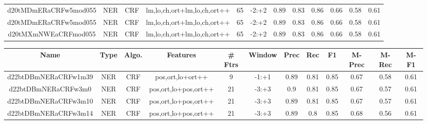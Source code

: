\documentclass[a4paper]{article}
\begin{document}
\begin{landscape}
\begin{center}
\begin{tabular}{ |c|c|c|c|c|c|c|c|c|c|c|c|}
 
 	
 	\small{ d20tMDmERaCRFw5mod055 } & \small{ NER} & \small{  CRF }  & lm,lo,ch,ort+lm,lo,ch,ort++  &  65 &  \small{  -2:+2 }  &  0.89 & 0.83 & 0.86  &  0.66 & 0.58 & 0.61 \\
 	

 
 	
 	\small{ d20tMDmERaCRFw5mod055 } & \small{ NER} & \small{  CRF }  & lm,lo,ch,ort+lm,lo,ch,ort++  &  65 &  \small{  -2:+2 }  &  0.89 & 0.83 & 0.86  &  0.66 & 0.58 & 0.61 \\
 	

 
 	
 	\small{ d20tMXmNWEaCRFmod055 } & \small{ NER} & \small{  CRF }  & lm,lo,ch,ort+lm,lo,ch,ort++  &  65 &  \small{  -2:+2 }  &  0.89 & 0.83 & 0.86  &  0.66 & 0.58 & 0.61 \\
 	
 \hline
\end{tabular}
\end{center}




\begin{center}
\begin{tabular}{ |c|c|c|c|c|c|c|c|c|c|c|c|} 
 \hline
 	Name & Type & Algo. & Features & \# Ftrs & Window & Prec & Rec & F1 & M-Prec & M-Rec & M-F1\\
 \hline

 	

 
 	
 	\small{ d22btDBmNERaCRFw1m39 } & \small{ NER} & \small{  CRF }  & pos,ort,lo+ort++  &  9 &  \small{  -1:+1 }  &  0.89 & 0.81 & 0.85  &  0.67 & 0.58 & 0.61 \\
 	

 
 	
 	\small{ d22btDBmNERaCRFw3m0 } & \small{ NER} & \small{  CRF }  & pos,ort,lo+pos,ort++  &  21 &  \small{  -3:+3 }  &  0.9 & 0.81 & 0.85  &  0.67 & 0.57 & 0.61 \\
 	

 
 	
 	\small{ d22btDBmNERaCRFw3m10 } & \small{ NER} & \small{  CRF }  & pos,ort,lo+pos,ort++  &  21 &  \small{  -3:+3 }  &  0.89 & 0.81 & 0.85  &  0.67 & 0.57 & 0.61 \\
 	

 
 	
 	\small{ d22btDBmNERaCRFw3m14 } & \small{ NER} & \small{  CRF }  & pos,ort,lo+pos,ort++  &  21 &  \small{  -3:+3 }  &  0.89 & 0.8 & 0.85  &  0.68 & 0.56 & 0.61 \\
 	


\end{tabular}
\end{center}
\end{landscape}
\end{document}
